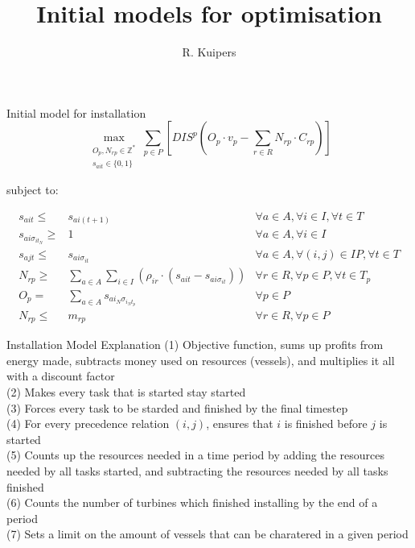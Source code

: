 \documentclass{beamer}
\title[Initial models for optimisation]{Initial models for optimisation}
\author{R. Kuipers}
\begin{document}
\begin{frame}
  \titlepage
\end{frame}

\begin{frame}{Initial model for installation}
\scriptsize
\begin{equation}
	\max_{\substack{O_p, N_{rp} \in \mathbb{Z}^* \\
	s_{ait} \in \{0, 1\}}} 
	\sum_{p \in P} [ DIS^p (O_p \cdot v_p - \sum_{r \in R} N_{rp} \cdot C_{rp}) ]
\end{equation}

\bigskip
subject to:

\begin{align}
s_{ait} \leq& s_{ai(t+1)}											&	\forall a \in A, \forall i \in I, \forall t \in T				\\
s_{ai\sigma_{it_N}} \geq& 1										&	\forall a \in A, \forall i \in I						\\
s_{ajt} \leq& s_{ai\sigma_{it}}										&	\forall a \in A, \forall (i, j) \in IP, \forall t \in T 			\\
N_{rp} \geq& \sum_{a \in A}\sum_{i\in I} (\rho_{ir} \cdot (s_{ait} - s_{ai\sigma_{it}}))		& 	\forall r \in R, \forall p \in P, \forall t \in T_p			\\
O_p =&  \sum_{a \in A} s_{ai_N\sigma_{i_Nt_p}}							& 	\forall p \in P 							\\
N_{rp} \leq& m_{rp}											& 	\forall r \in R, \forall p \in P
\end{align}

\end{frame}

\begin{frame}{Installation Model Explanation}
(1) Objective function, sums up profits from energy made, subtracts money used on resources (vessels), and multiplies it all with a discount factor	\\
(2) Makes every task that is started stay started 	\\
(3) Forces every task to be starded and finished by the final timestep	\\
(4) For every precedence relation $(i, j)$, ensures that $i$ is finished before $j$ is started 	\\
(5) Counts up the resources needed in a time period by adding the resources needed by all tasks started, and subtracting the resources needed by all tasks finished	\\
(6) Counts the number of turbines which finished installing by the end of a period	\\
(7) Sets a limit on the amount of vessels that can be charatered in a given period
\end{frame}
\end{document}
